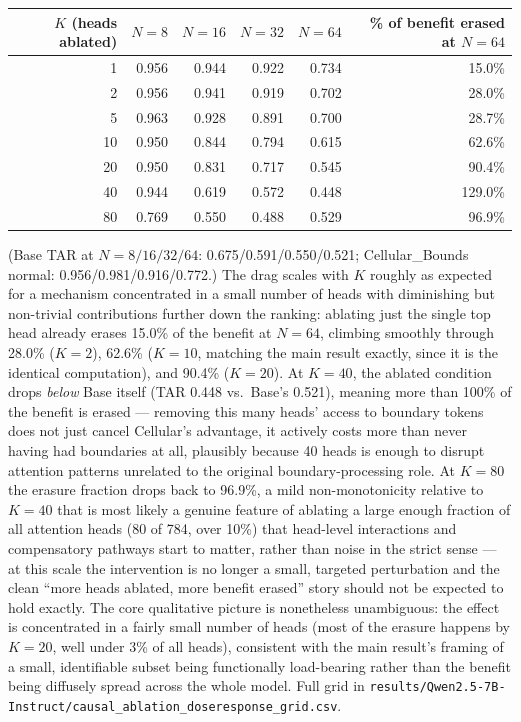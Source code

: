 \documentclass[11pt]{article}
\begin{document}
\begin{table}[htbp]
\centering
\small
\begin{tabular}{rrrrrr}
\toprule
$K$ (heads ablated) & $N=8$ & $N=16$ & $N=32$ & $N=64$ & \% of benefit erased at $N=64$ \\
\midrule
1  & 0.956 & 0.944 & 0.922 & 0.734 & 15.0\% \\
2  & 0.956 & 0.941 & 0.919 & 0.702 & 28.0\% \\
5  & 0.963 & 0.928 & 0.891 & 0.700 & 28.7\% \\
10 & 0.950 & 0.844 & 0.794 & 0.615 & 62.6\% \\
20 & 0.950 & 0.831 & 0.717 & 0.545 & 90.4\% \\
40 & 0.944 & 0.619 & 0.572 & 0.448 & 129.0\% \\
80 & 0.769 & 0.550 & 0.488 & 0.529 & 96.9\% \\
\bottomrule
\end{tabular}
\end{table}

(Base TAR at $N=8/16/32/64$: 0.675/0.591/0.550/0.521; Cellular\_Bounds normal: 0.956/0.981/0.916/0.772.) The drag scales with $K$ roughly as expected for a mechanism concentrated in a small number of heads with diminishing but non-trivial contributions further down the ranking: ablating just the single top head already erases 15.0\% of the benefit at $N=64$, climbing smoothly through 28.0\% ($K=2$), 62.6\% ($K=10$, matching the main result exactly, since it is the identical computation), and 90.4\% ($K=20$). At $K=40$, the ablated condition drops \emph{below} Base itself (TAR 0.448 vs.\ Base's 0.521), meaning more than 100\% of the benefit is erased --- removing this many heads' access to boundary tokens does not just cancel Cellular's advantage, it actively costs more than never having had boundaries at all, plausibly because 40 heads is enough to disrupt attention patterns unrelated to the original boundary-processing role. At $K=80$ the erasure fraction drops back to 96.9\%, a mild non-monotonicity relative to $K=40$ that is most likely a genuine feature of ablating a large enough fraction of all attention heads (80 of 784, over 10\%) that head-level interactions and compensatory pathways start to matter, rather than noise in the strict sense --- at this scale the intervention is no longer a small, targeted perturbation and the clean ``more heads ablated, more benefit erased'' story should not be expected to hold exactly. The core qualitative picture is nonetheless unambiguous: the effect is concentrated in a fairly small number of heads (most of the erasure happens by $K=20$, well under 3\% of all heads), consistent with the main result's framing of a small, identifiable subset being functionally load-bearing rather than the benefit being diffusely spread across the whole model. Full grid in \texttt{results/Qwen2.5-7B-Instruct/causal\_ablation\_doseresponse\_grid.csv}.
\end{document}
